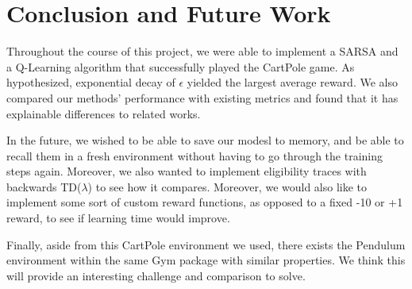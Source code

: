 \section{Conclusion and Future Work}

Throughout the course of this project, we were able to implement a SARSA and a Q-Learning algorithm that successfully played the CartPole game. 
As hypothesized, exponential decay of $\epsilon$ yielded the largest average reward. We also compared our methods' performance with existing metrics
and found that it has explainable differences to related works. 

In the future, we wished to be able to save our modesl to memory, and be able to recall them in a fresh environment without having to go through the training
steps again. Moreover, we also wanted to implement eligibility traces with backwards TD($\lambda$) to see how it compares. Moreover, we would also like to implement
some sort of custom reward functions, as opposed to a fixed -10 or +1 reward, to see if learning time would improve.

Finally, aside from this CartPole environment we used, there exists the Pendulum environment within the same Gym package with similar properties. We think this
will provide an interesting challenge and comparison to solve.